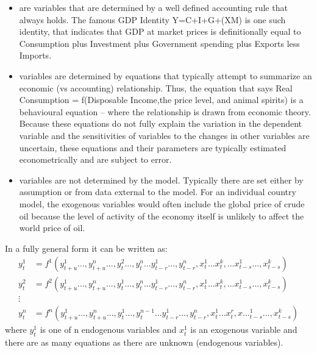 \documentclass[letterpaper,10pt,english]{jupyterBook}
\begin{document}
\sphinxAtStartPar
{}
\begin{itemize}
\item {} 
\sphinxAtStartPar
{} are variables that are determined by a well defined accounting rule that always holds. The famous GDP Identity Y=C+I+G+(X\sphinxhyphen{}M) is one such identity, that indicates that GDP at market prices is definitionally equal to Consumption plus Investment plus Government spending plus Exports less Imports.

\item {} 
\sphinxAtStartPar
{} variables are determined by equations that typically attempt to summarize an economic (vs accounting) relationship. Thus, the equation that says Real Consumption = f(Disposable Income,the price level, and animal spirits) is a behavioural equation – where the relationship is drawn from economic theory. Because these equations do not fully explain the variation in the dependent variable and the sensitivities of variables to the changes in other variables are uncertain, these equations and their parameters are  typically estimated econometrically and are subject to error.

\item {} 
\sphinxAtStartPar
{} variables are not determined by the model. Typically there are set either by assumption or from data external to the model.  For an individual country model, the exogenous variables would often include the global price of crude oil  because the level of activity of the economy itself is unlikely to affect the world price of oil.

\end{itemize}

\sphinxAtStartPar
In a fully general form it can be written as:
\label{equation:content/02_MacrostructuralModels/MacroStructuralModels:5c8a370d-512b-4637-9118-8b826f0e98eb}\begin{align}
y_t^1  &=  f^1(y_{t+u}^1...,y_{t+u}^n...,y_t^2...,y_{t}^n...y_{t-r}^1...,y_{t-r}^n,x_t^1...x_{t}^k,...x_{t-s}^1...,x_{t-s}^k) \\
y_t^2  &=  f^2(y_{t+u}^1...,y_{t+u}^n...,y_t^1...,y_{t}^n...y_{t-r}^1...,y_{t-r}^n,x_t^1...x_{t}^k,...x_{t-s}^1...,x_{t-s}^k) \\
\vdots \\
y_t^n  &=  f^n(y_{t+u}^1...,y_{t+u}^n...,y_t^1...,y_{t}^{n-1}...y_{t-r}^1...,y_{t-r}^n,x_t^1...x_{t}^r,x..._{t-s}^1...,x_{t-s}^k)
\end{align}
\sphinxAtStartPar
where \( y_t^1 \) is one of n endogenous variables and \(x_t^1\) is an exogenous variable and there are as many equations as there are unknown (endogenous variables).
\end{document}
